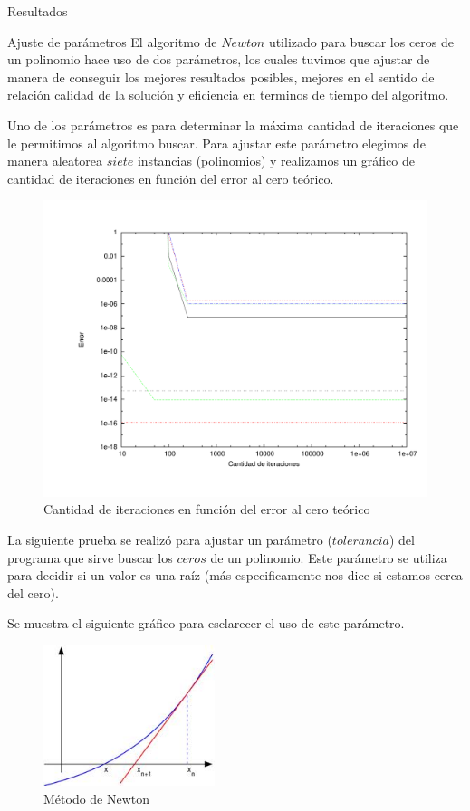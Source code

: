 \begin{section}{Resultados}
	\begin{subsection}{Ajuste de parámetros}
		El algoritmo de $Newton$ utilizado para buscar los ceros de un polinomio hace uso de dos parámetros, los cuales tuvimos que ajustar de manera de conseguir los mejores resultados posibles, mejores en el sentido de relación calidad de la solución y eficiencia en terminos de tiempo del algoritmo.
		
		Uno de los parámetros es para determinar la máxima cantidad de iteraciones que le permitimos al algoritmo buscar. 
		Para ajustar este parámetro elegimos de manera aleatorea $siete$ instancias (polinomios) y realizamos un gráfico de cantidad de iteraciones en función
		del error al cero teórico.

		\begin{figure}[H]
		  \centering
			\includegraphics[width=14cm]{graficos/iter_graf.pdf}
		  \caption{Cantidad de iteraciones en función del error al cero teórico}
		  \label{fig:iter}
		\end{figure}

		La siguiente prueba se realizó para ajustar un parámetro ($tolerancia$) del programa que sirve buscar los $ceros$ de un polinomio. Este parámetro se utiliza para decidir si un valor es una raíz (más especificamente nos dice si estamos cerca del cero).
		
		Se muestra el siguiente gráfico para esclarecer el uso de este parámetro.
		
		\begin{figure}[H]
		  \centering
			\includegraphics[width=5cm]{graficos/newton.jpg}
		  \caption{Método de Newton}
		  \label{fig:newton}
		\end{figure}
		

\end{subsection}
\end{section}
